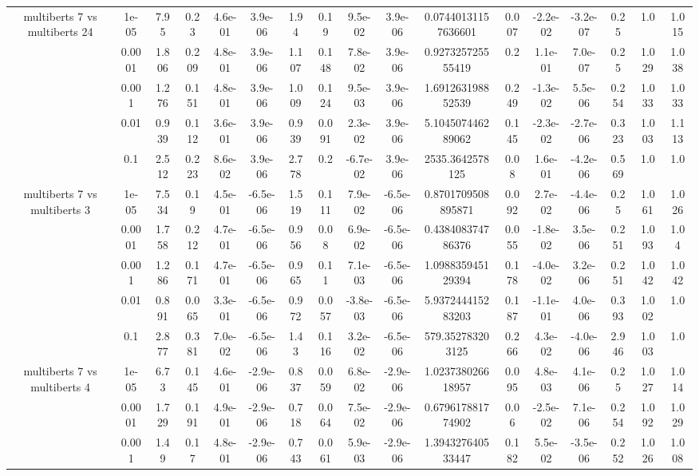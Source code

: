 \begin{tabular}{|c|c|c|c|c|c|c|c|c|c|c|c|c|c|c|c|c|}
\hline
\multirow{5}{*}{multiberts 7 vs multiberts 24} & 1e-05 & 7.95 & 0.23 & 4.6e-01 & 3.9e-06 & 1.94 & 0.19 & 9.5e-02 & 3.9e-06 & 0.07440131157636601 & 0.007 & -2.2e-02 & -3.2e-07 & 0.25 & 1.0 & 1.015 \\
 & 0.0001 & 1.806 & 0.209 & 4.8e-01 & 3.9e-06 & 1.107 & 0.148 & 7.8e-02 & 3.9e-06 & 0.927325725555419 & 0.2 & 1.1e-01 & 7.0e-07 & 0.25 & 1.029 & 1.038 \\
 & 0.001 & 1.276 & 0.151 & 4.8e-01 & 3.9e-06 & 1.009 & 0.124 & 9.5e-03 & 3.9e-06 & 1.691263198852539 & 0.249 & -1.3e-02 & 5.5e-06 & 0.254 & 1.033 & 1.033 \\
 & 0.01 & 0.939 & 0.112 & 3.6e-01 & 3.9e-06 & 0.939 & 0.091 & 2.3e-02 & 3.9e-06 & 5.104507446289062 & 0.145 & -2.3e-02 & -2.7e-06 & 0.323 & 1.003 & 1.113 \\
 & 0.1 & 2.512 & 0.223 & 8.6e-02 & 3.9e-06 & 2.778 & 0.2 & -6.7e-02 & 3.9e-06 & 2535.3642578125 & 0.08 & 1.6e-01 & -4.2e-06 & 0.569 & 1.0 & 1.0 \\
\hline
\multirow{5}{*}{multiberts 7 vs multiberts 3} & 1e-05 & 7.534 & 0.19 & 4.5e-01 & -6.5e-06 & 1.519 & 0.111 & 7.9e-02 & -6.5e-06 & 0.8701709508895871 & 0.092 & 2.7e-02 & -4.4e-06 & 0.25 & 1.061 & 1.026 \\
 & 0.0001 & 1.758 & 0.212 & 4.7e-01 & -6.5e-06 & 0.956 & 0.08 & 6.9e-02 & -6.5e-06 & 0.438408374786376 & 0.055 & -1.8e-02 & 3.5e-06 & 0.251 & 1.093 & 1.04 \\
 & 0.001 & 1.286 & 0.171 & 4.7e-01 & -6.5e-06 & 0.965 & 0.11 & 7.1e-03 & -6.5e-06 & 1.098835945129394 & 0.178 & -4.0e-02 & 3.2e-06 & 0.251 & 1.042 & 1.042 \\
 & 0.01 & 0.891 & 0.065 & 3.3e-01 & -6.5e-06 & 0.972 & 0.057 & -3.8e-03 & -6.5e-06 & 5.937244415283203 & 0.187 & -1.1e-01 & 4.0e-06 & 0.393 & 1.002 & 1.0 \\
 & 0.1 & 2.877 & 0.381 & 7.0e-02 & -6.5e-06 & 1.43 & 0.116 & 3.2e-02 & -6.5e-06 & 579.352783203125 & 0.266 & 4.3e-02 & -4.0e-06 & 2.946 & 1.003 & 1.0 \\
\hline
\multirow{5}{*}{multiberts 7 vs multiberts 4} & 1e-05 & 6.73 & 0.145 & 4.6e-01 & -2.9e-06 & 0.837 & 0.059 & 6.8e-02 & -2.9e-06 & 1.023738026618957 & 0.095 & 4.8e-03 & 4.1e-06 & 0.25 & 1.027 & 1.014 \\
 & 0.0001 & 1.729 & 0.191 & 4.9e-01 & -2.9e-06 & 0.718 & 0.064 & 7.5e-02 & -2.9e-06 & 0.679617881774902 & 0.06 & -2.5e-02 & 7.1e-06 & 0.254 & 1.092 & 1.029 \\
 & 0.001 & 1.49 & 0.17 & 4.8e-01 & -2.9e-06 & 0.743 & 0.061 & 5.9e-03 & -2.9e-06 & 1.394327640533447 & 0.182 & 5.5e-02 & -3.5e-06 & 0.252 & 1.026 & 1.008 \\

\end{tabular}
